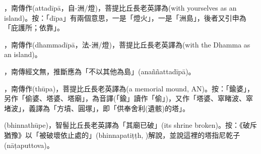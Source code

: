 \startitemgroup[noteitems]
\item{}，南傳作(attadīpā，自-洲/燈)，菩提比丘長老英譯為(with yourselves as an island)。按：「dīpa」有兩個意思，一是「燈火」，一是「洲島」，後者又引申為「庇護所；依靠」。
\item{}，南傳作(dhammadīpā，法-洲/燈)，菩提比丘長老英譯為(with the Dhamma as an island)。
\item{}，南傳經文無，推斷應為「不以其他為島」(anaññattadīpā)。
\stopitemgroup

\startitemgroup[noteitems]
\item{}，南傳作(thūpa)，菩提比丘長老英譯為(a memorial mound, AN)。按：「鍮婆」，另作「偷婆、塔婆、塔廟」，為音譯(「鍮」讀作「偷」)，又作「塔婆、窣睹波、窣堵波」，義譯為「方墳、圓塚」，即「供奉舍利(遺骸)的塔」。
\item{}(bhinnathūpe)，智髻比丘長老英譯為「其廟已破」(its shrine broken)。按：《破斥猶豫》以「被破壞依止處的」(bhinnapatiṭṭh, )解說，並說這裡的塔指尼乾子(nāṭaputtova)。
\stopitemgroup

